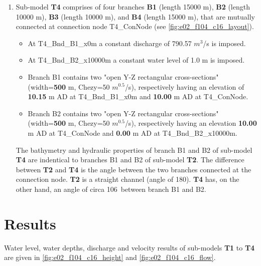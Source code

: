\begin{enumerate}
	\item Sub-model \textbf{\textcolor[rgb]{1,0,0}{T4}} comprises of four branches \textbf{B1} (length 15000 m), \textbf{B2} (length 10000 m), \textbf{B3} (length 10000 m), and \textbf{B4} (length 15000 m), that are mutually connected at connection node T4\_ConNode (see \autoref{fig:e02_f104_c16_layout}).
		\begin{itemize}
			\item At T4\_Bnd\_B1\_x0m a constant discharge of 790.57 $m^3$/s is imposed.
			\item At T4\_Bnd\_B2\_x10000m a constant water level of 1.0 m is imposed.
			\item Branch B1 contains two "open Y-Z rectangular cross-sections" (width=\textbf{\textcolor[rgb]{0.5,0,0.15}{500}} m, Chezy=50 $m^{0.5}$/s), respectively having an elevation of \textbf{10.15} m AD at T4\_Bnd\_B1\_x0m and \textbf{10.00} m AD at T4\_ConNode. 
			\item Branch B2 contains two "open Y-Z rectangular cross-sections" (width=\textbf{\textcolor[rgb]{0.5,0,0.15}{500}} m, Chezy=50 $m^{0.5}$/s), respectively having an elevation \textbf{10.00} m AD at T4\_ConNode and \textbf{0.00} m AD at \newline T4\_Bnd\_B2\_x10000m.
		\end{itemize}
		
			\Note The bathymetry and hydraulic properties of branch B1 and B2 of sub-model \textbf{\textcolor[rgb]{1,0,0}{T4}} are indentical to branches B1 and B2 of sub-model \textbf{\textcolor[rgb]{1,0,0}{T2}}. The difference between \textbf{\textcolor[rgb]{1,0,0}{T2}} and \textbf{\textcolor[rgb]{1,0,0}{T4}} is the angle between the two branches connected at the connection node. \textbf{\textcolor[rgb]{1,0,0}{T2}} is a straight channel (angle of 180\textdegree).  \textbf{\textcolor[rgb]{1,0,0}{T4}} has, on the other hand, an angle of circa 106\textdegree \, between branch B1 and B2.\\
	
	\end{enumerate}	
\section*{Results}
Water level, water depths, discharge and velocity results of sub-models \textbf{\textcolor[rgb]{1,0,0}{T1}} to \textbf{\textcolor[rgb]{1,0,0}{T4}} are given in \autoref{fig:e02_f104_c16_height} and \autoref{fig:e02_f104_c16_flow}.

